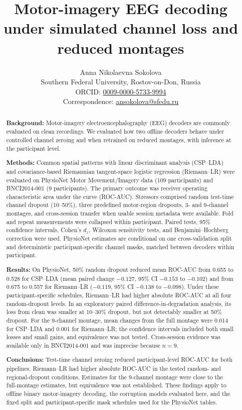 \documentclass[11pt]{article}
\title{Motor-imagery EEG decoding under simulated channel loss and reduced montages}
\author{Anna Nikolaevna Sokolova\\
\small Southern Federal University, Rostov-on-Don, Russia\\
\small ORCID: \href{https://orcid.org/0009-0000-5733-9994}{0009-0000-5733-9994}\\
\small Correspondence: \href{mailto:ansokolova@sfedu.ru}{ansokolova@sfedu.ru}}
\date{}
\begin{document}
\maketitle
\linenumbers

\begin{abstract}
\textbf{Background:} Motor-imagery electroencephalography (EEG) decoders are commonly evaluated on clean recordings. We evaluated how two offline decoders behave under controlled channel zeroing and when retrained on reduced montages, with inference at the participant level.

\textbf{Methods:} Common spatial patterns with linear discriminant analysis (CSP--LDA) and covariance-based Riemannian tangent-space logistic regression (Riemann--LR) were evaluated on PhysioNet Motor Movement/Imagery data (109 participants) and BNCI2014-001 (9 participants). The primary outcome was receiver operating characteristic area under the curve (ROC-AUC). Stressors comprised random test-time channel dropout (10--50\%), three predefined motor-region dropouts, 3- and 9-channel montages, and cross-session transfer when usable session metadata were available. Fold and repeat measurements were collapsed within participant. Paired tests, 95\% confidence intervals, Cohen's $d_z$, Wilcoxon sensitivity tests, and Benjamini--Hochberg correction were used. PhysioNet estimates are conditional on one cross-validation split and deterministic participant-specific channel masks, matched between decoders within participant.

\textbf{Results:} On PhysioNet, 50\% random dropout reduced mean ROC-AUC from 0.655 to 0.528 for CSP--LDA (mean paired change $-0.127$, 95\% CI $-0.153$ to $-0.102$) and from 0.675 to 0.557 for Riemann--LR ($-0.119$, 95\% CI $-0.138$ to $-0.098$). Under these participant-specific schedules, Riemann--LR had higher absolute ROC-AUC at all four random-dropout levels. In an exploratory paired difference-in-degradation analysis, its loss from clean was smaller at 10--30\% dropout, but not detectably smaller at 50\% dropout. For the 9-channel montage, mean changes from the full montage were 0.014 for CSP--LDA and 0.001 for Riemann--LR; the confidence intervals included both small losses and small gains, and equivalence was not tested. Cross-session evidence was available only in BNCI2014-001 and was imprecise because $n=9$.

\textbf{Conclusions:} Test-time channel zeroing reduced participant-level ROC-AUC for both pipelines. Riemann--LR had higher absolute ROC-AUC in the tested random- and regional-dropout conditions. Estimates for the 9-channel montage were close to the full-montage estimates, but equivalence was not established. These findings apply to offline binary motor-imagery decoding, the corruption models evaluated here, and the fixed split and participant-specific mask schedules used for the PhysioNet tables.
\end{abstract}
\end{document}
